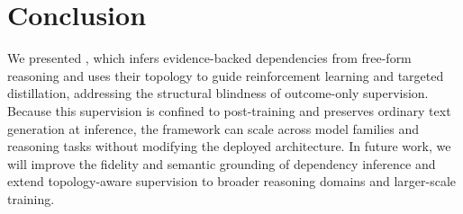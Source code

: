 \section{Conclusion}
\label{sec:conclusion}

\label{sec:limitations_future}

We presented \method, which infers evidence-backed dependencies from free-form reasoning and uses their topology to guide reinforcement learning and targeted distillation, addressing the structural blindness of outcome-only supervision. Because this supervision is confined to post-training and preserves ordinary text generation at inference, the framework can scale across model families and reasoning tasks without modifying the deployed architecture. In future work, we will improve the fidelity and semantic grounding of dependency inference and extend topology-aware supervision to broader reasoning domains and larger-scale training.

\clearpage
